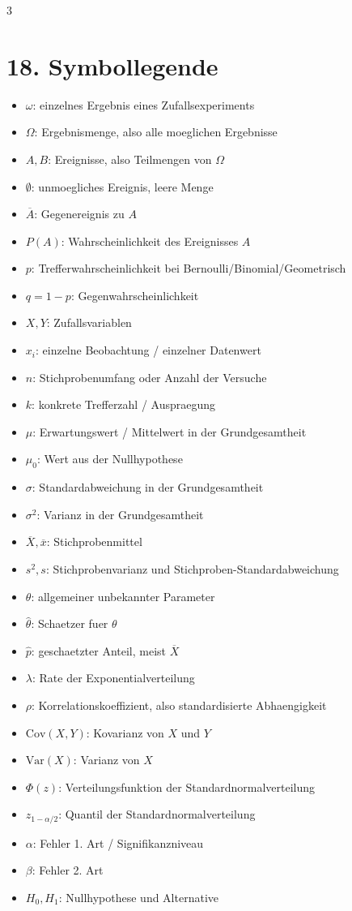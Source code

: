 \documentclass[a4paper,8pt,landscape]{article}
\newcommand{\Var}{\mathrm{Var}}
\newcommand{\Cov}{\mathrm{Cov}}
\begin{document}
\begin{multicols*}{3}
\section*{18. Symbollegende}
\begin{itemize}
  \item $\omega$: einzelnes Ergebnis eines Zufallsexperiments
  \item $\Omega$: Ergebnismenge, also alle moeglichen Ergebnisse
  \item $A,B$: Ereignisse, also Teilmengen von $\Omega$
  \item $\emptyset$: unmoegliches Ereignis, leere Menge
  \item $\overline A$: Gegenereignis zu $A$
  \item $P(A)$: Wahrscheinlichkeit des Ereignisses $A$
  \item $p$: Trefferwahrscheinlichkeit bei Bernoulli/Binomial/Geometrisch
  \item $q=1-p$: Gegenwahrscheinlichkeit
  \item $X,Y$: Zufallsvariablen
  \item $x_i$: einzelne Beobachtung / einzelner Datenwert
  \item $n$: Stichprobenumfang oder Anzahl der Versuche
  \item $k$: konkrete Trefferzahl / Auspraegung
  \item $\mu$: Erwartungswert / Mittelwert in der Grundgesamtheit
  \item $\mu_0$: Wert aus der Nullhypothese
  \item $\sigma$: Standardabweichung in der Grundgesamtheit
  \item $\sigma^2$: Varianz in der Grundgesamtheit
  \item $\overline X,\overline x$: Stichprobenmittel
  \item $s^2,s$: Stichprobenvarianz und Stichproben-Standardabweichung
  \item $\theta$: allgemeiner unbekannter Parameter
  \item $\hat \theta$: Schaetzer fuer $\theta$
  \item $\hat p$: geschaetzter Anteil, meist $\overline X$
  \item $\lambda$: Rate der Exponentialverteilung
  \item $\rho$: Korrelationskoeffizient, also standardisierte Abhaengigkeit
  \item $\Cov(X,Y)$: Kovarianz von $X$ und $Y$
  \item $\Var(X)$: Varianz von $X$
  \item $\Phi(z)$: Verteilungsfunktion der Standardnormalverteilung
  \item $z_{1-\alpha/2}$: Quantil der Standardnormalverteilung
  \item $\alpha$: Fehler 1. Art / Signifikanzniveau
  \item $\beta$: Fehler 2. Art
  \item $H_0,H_1$: Nullhypothese und Alternative
\end{itemize}

\end{multicols*}
\end{document}
